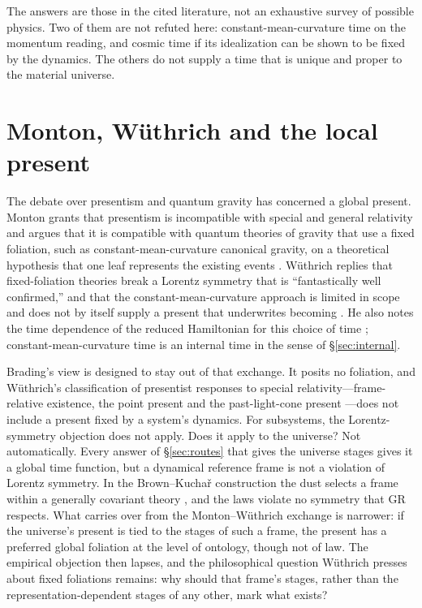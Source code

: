 \documentclass[11pt]{article}
\begin{document}
The answers are those in the cited literature, not an exhaustive survey of
possible physics. Two of them are not refuted here: constant-mean-curvature time on
the momentum reading, and cosmic time if its idealization can be shown to be fixed
by the dynamics. The others do not supply a time that is unique and proper to the
material universe.

\section{Monton, Wüthrich and the local present}\label{sec:mw}

The debate over presentism and quantum gravity has concerned a global present.
Monton grants that presentism is incompatible with special and general
relativity and argues that it is compatible with quantum theories of gravity that
use a fixed foliation, such as constant-mean-curvature canonical gravity, on a
theoretical hypothesis that one leaf represents the existing events
\citep{Monton2006}. Wüthrich replies that fixed-foliation theories break a
Lorentz symmetry that is ``fantastically well confirmed,'' and that the
constant-mean-curvature approach is limited in scope and does not by itself
supply a present that underwrites becoming \citep[pp.~269--275]{Wuthrich2010}. He
also notes the time dependence of the reduced Hamiltonian for this choice of time
\citep[p.~274]{Wuthrich2010}; constant-mean-curvature time is an internal time in
the sense of \S\ref{sec:internal}.

Brading's view is designed to stay out of that exchange. It posits no foliation,
and Wüthrich's classification of presentist responses to special
relativity---frame-relative existence, the point present and the past-light-cone
present \citep[pp.~263--264]{Wuthrich2010}---does not include a present fixed by a
system's dynamics. For subsystems, the Lorentz-symmetry objection does not apply.
Does it apply to the universe? Not automatically. Every answer of
\S\ref{sec:routes} that gives the universe stages gives it a global time function,
but a dynamical reference frame is not a violation of Lorentz symmetry. In the
Brown--Kuchař construction the dust selects a frame within a generally covariant
theory \citep{BrownKuchar1995}, and the laws violate no symmetry that GR respects.
What carries over from the Monton--Wüthrich exchange is narrower: if the universe's
present is tied to the stages of such a frame, the present has a preferred global
foliation at the level of ontology, though not of law. The empirical objection
then lapses, and the philosophical question Wüthrich presses about fixed foliations
remains: why should that frame's stages, rather than the representation-dependent
stages of any other, mark what exists?
\end{document}
